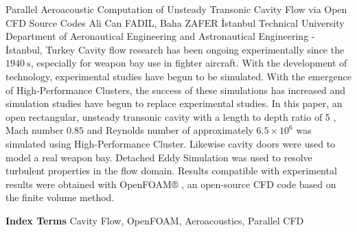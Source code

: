 
    \begin{abstract_online}{Parallel Aeroacoustic Computation of Unsteady Transonic Cavity Flow via Open CFD Source Codes}{%
        Ali Can FADIL, Baha ZAFER}{%
        }{%
        İstanbul Technical University Department of Aeronautical Engineering and Astronautical Engineering - İstanbul, Turkey}
    Cavity flow research has been ongoing experimentally since the $1940 \mathrm{~s}$, especially for weapon bay use in fighter aircraft. With the development of technology, experimental studies have begun to be simulated. With the emergence of High-Performance Clusters, the success of these simulations has increased and simulation studies have begun to replace experimental studies. In this paper, an open rectangular, unsteady transonic cavity with a length to depth ratio of 5 , Mach number $0.85$ and Reynolds number of approximately $6.5 \times 10^{6}$ was simulated using High-Performance Cluster. Likewise cavity doors were used to model a real weapon bay. Detached Eddy Simulation was used to resolve turbulent properties in the flow domain. Results compatible with experimental results were obtained with OpenFOAM® , an open-source CFD code based on the finite volume method. 
    
            \textbf{Index Terms} \newline{}Cavity Flow, OpenFOAM, Aeroacoustics, Parallel CFD
    \end{abstract_online}
    